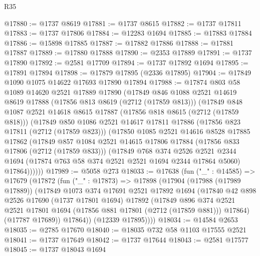 \begin{lexlean}{R35}
\begin{coremodule}
@17880 := @1737 @8619
@17881 := @1737 @8615
@17882 := @1737 @17811
@17883 := @1737 @17806
@17884 := @12283 @1694
@17885 := @17883 @17884
@17886 := @15898 @17885
@17887 := @17882 @17886
@17888 := @17881 @17887
@17889 := @17880 @17888
@17890 := @2353 @17889
@17891 := @1737 @17890
@17892 := @2581 @17709
@17894 := @1737 @17892 @1694
@17895 := @17891 @17894
@17898 := @17879 @17895 (@2336 @17895)
@17904 := @17849 @1090 @1075 @14622 @17693 @17890 @17894
@17988 := @17874
    @803
    @58
    @1089
    @14620
    @2521
    @17889
    @17890
    (@17849
      @846
      @1088
      @2521
      @14619
      @8619
      @17888
      (@17856 @813 @8619 (@2712 (@17859 @813)))
      (@17849
        @848
        @1087
        @2521
        @14618
        @8615
        @17887
        (@17856 @818 @8615 (@2712 (@17859 @818)))
        (@17849
          @850
          @1086
          @2521
          @14617
          @17811
          @17886
          (@17856 @823 @17811 (@2712 (@17859 @823)))
          (@17850
            @1085
            @2521
            @14616
            @8528
            @17885
            @17862
            (@17849
              @857
              @1084
              @2521
              @14615
              @17806
              @17884
              (@17856 @833 @17806 (@2712 (@17859 @833)))
              (@17849
                @768
                @374
                @2526
                @2521
                @2344
                @1694
                (@17874 @763 @58 @374 @2521 @2521 @1694 @2344 @17864 @5060)
                @17864))))))
@17989 := @5058 @273
@18033 := @17638
    (fun ("_" : @14585) =>
    @17679
      (@17872
        (fun ("_" : @17873) =>
        @17898
          (@17904
            (@17988 (@17989 @17889))
            (@17849
              @1073
              @374
              @17691
              @2521
              @17892
              @1694
              (@17840
                @42
                @898
                @2526
                @17690
                (@1737 @17801 @1694)
                @17892
                (@17849
                  @896
                  @374
                  @2521
                  @2521
                  @17801
                  @1694
                  (@17856 @881 @17801 (@2712 (@17859 @881)))
                  @17864)
                (@17787 @17689))
              @17864))
          (@12339 @17895))))
@18034 := @14584 @2653
@18035 := @2785 @17670
@18040 := @18035 @732 @58 @1103 @17555 @2521
@18041 := @1737 @17649
@18042 := @1737 @17644
@18043 := @2581 @17577
@18045 := @1737 @18043 @1694

\end{coremodule}
\end{lexlean}
